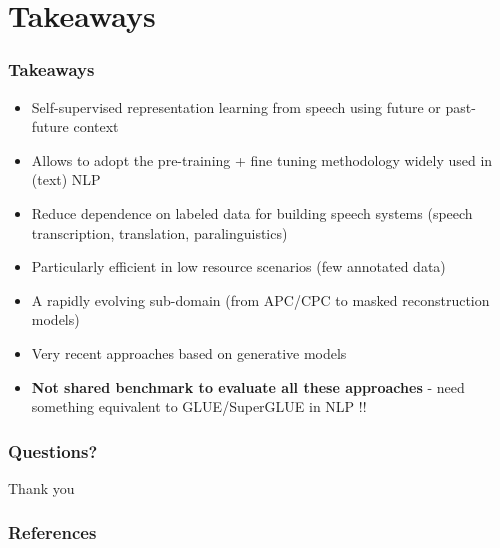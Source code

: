 \documentclass[table]{beamer}
\begin{document}
\section{Takeaways}



\begin{frame}
\frametitle{Takeaways}

		\begin{itemize}
			\item Self-supervised representation learning from speech using future or past-future context
			\item Allows to adopt the pre-training + fine tuning methodology widely used in (text) NLP 
			\item Reduce dependence on labeled data for building speech systems (speech transcription, translation, paralinguistics)
			\item Particularly efficient in low resource scenarios (few annotated data)
			\item A rapidly evolving sub-domain (from APC/CPC to masked reconstruction models) 
			\item Very recent approaches based on generative models \citep{khurana2020convolutional}
			\item \textbf{Not shared benchmark to evaluate all these approaches} - need something equivalent to GLUE/SuperGLUE in NLP !!
		\end{itemize}
\end{frame}













\begin{frame}
	\frametitle{Questions?}
	
	\vfill
	\centerline{\Huge Thank you}
	\vfill
\end{frame}












\begin{frame}[allowframebreaks]
        \frametitle{References}
        {\scriptsize
        
        }
\end{frame}    
\end{document}
